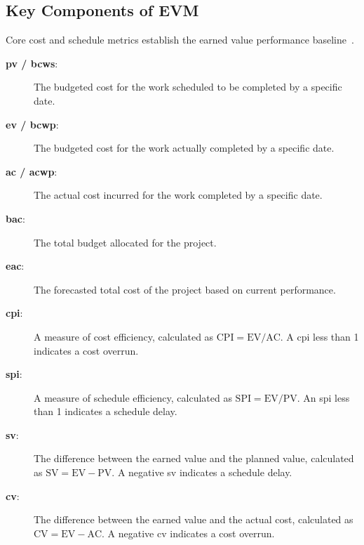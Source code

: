 \documentclass[../main.tex]{subfiles}
\begin{document}
\subsection{Key Components of EVM}
Core cost and schedule metrics establish the earned value performance baseline~\autocite{edo-3-6-1-evm-intro-2025, edo-3-6-2-evm-analysis-2025}.
\begin{description}
	\item [\textbf{\ac{pv} / \ac{bcws}}:] The budgeted cost for the work scheduled to be completed by a specific date.
	\item [\textbf{\ac{ev} / \ac{bcwp}}:] The budgeted cost for the work actually completed by a specific date.
	\item [\textbf{\ac{ac} / \ac{acwp}}:] The actual cost incurred for the work completed by a specific date.
	\item [\textbf{\ac{bac}}:] The total budget allocated for the project.
	\item [\textbf{\ac{eac}}:] The forecasted total cost of the project based on current performance.
	\item [\textbf{\ac{cpi}}:] A measure of cost efficiency, calculated as $\text{CPI} = \text{EV} / \text{AC}$. A \ac{cpi} less than 1 indicates a cost overrun.
	\item [\textbf{\ac{spi}}:] A measure of schedule efficiency, calculated as $\text{SPI} = \text{EV} / \text{PV}$. An \ac{spi} less than 1 indicates a schedule delay.
	\item [\textbf{\ac{sv}}:] The difference between the earned value and the planned value, calculated as $\text{SV} = \text{EV} - \text{PV}$. A negative \ac{sv} indicates a schedule delay.
	\item [\textbf{\ac{cv}}:] The difference between the earned value and the actual cost, calculated as $\text{CV} = \text{EV} - \text{AC}$. A negative \ac{cv} indicates a cost overrun.
\end{description}
\end{document}

